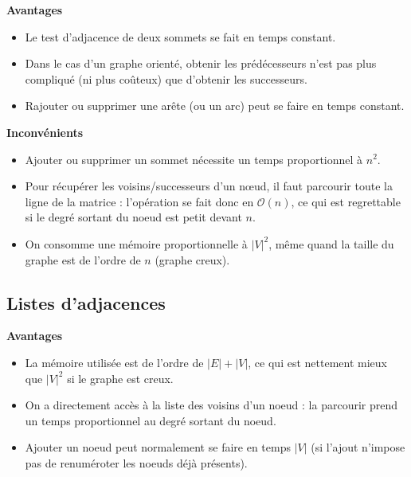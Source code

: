 \textbf{Avantages}

\begin{itemize}
\item Le test d’adjacence de deux sommets se fait en temps constant.
\item Dans le cas d’un graphe orienté, obtenir les prédécesseurs n’est pas plus compliqué (ni plus coûteux)
que d’obtenir les successeurs.
\item Rajouter ou supprimer une arête (ou un arc) peut se faire en temps constant.
\end{itemize}

\textbf{Inconvénients}
\begin{itemize}
\item Ajouter ou supprimer un sommet nécessite un temps proportionnel à $n^2$.
\item Pour récupérer les voisins/successeurs d’un nœud, il faut parcourir toute la ligne de la matrice :
l’opération se fait donc en $\mathcal{O}(n)$, ce qui est regrettable si le degré sortant du noeud est petit devant $n$.
\item On consomme une mémoire proportionnelle à $|V|^2$, même quand la taille du graphe est de l’ordre de $n$ (graphe creux).
\end{itemize}


\subsection{Listes d'adjacences}



\textbf{Avantages}
\begin{itemize}
\item La mémoire utilisée est de l’ordre de $|E| + |V|$, ce qui est nettement mieux que $|V|^2$ si le graphe est
creux.
\item On a directement accès à la liste des voisins d’un noeud : la parcourir prend un temps proportionnel
au degré sortant du noeud.%
\item Ajouter un noeud peut normalement se faire en temps $|V|$ (si l’ajout n’impose pas de renuméroter
les noeuds déjà présents).
\end{itemize}

